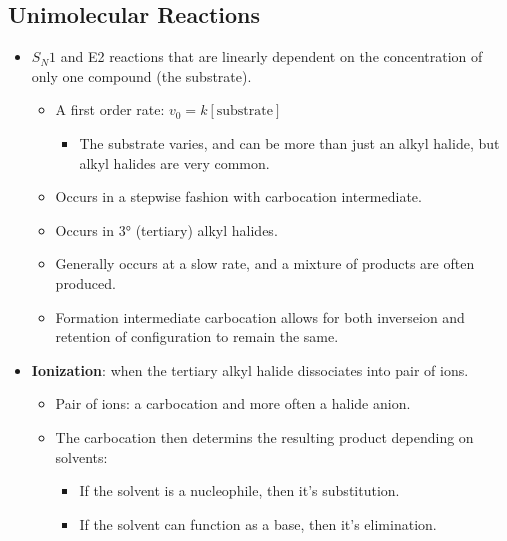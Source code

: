 \documentclass[12pt,a4paper]{article}
\begin{document}
\subsection{Unimolecular Reactions}
\begin{itemize}
    \item \(S_N1\) and E2 reactions that are linearly dependent on the concentration of only one compound (the substrate).
        \begin{itemize}
            \item A first order rate: \(v_0=k[\text{substrate}]\) 
                \begin{itemize}
                    \item The substrate varies, and can be more than just an alkyl halide, but alkyl halides are very common.
                \end{itemize}
            \item Occurs in a {\color{o-Sun}stepwise} fashion with carbocation intermediate.
            \item Occurs in {\color{o-Sun}\ang{3} (tertiary) alkyl halides}.
            \item Generally occurs at a slow rate, and a mixture of products are often produced.
            \item Formation intermediate carbocation allows for both inverseion and retention of configuration to remain the same.
        \end{itemize}
    \item \textbf{Ionization}: when the tertiary alkyl halide dissociates into pair of ions.
        \begin{itemize}
            \item Pair of ions: a {\color{pos}carbocation} and more often a {\color{neg}halide anion}.
            \item The carbocation then determins the resulting product depending on solvents:
                \begin{itemize}
                    \item If the solvent is a nucleophile, then it's substitution.
                    \item If the solvent can function as a base, then it's elimination.
                \end{itemize}
        \end{itemize}

\end{itemize}
\end{document}
